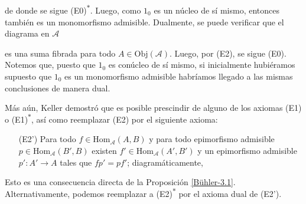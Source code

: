 \documentclass[tesis]{subfiles}
\begin{document}
\begin{Obs}
\begin{enumerate}[label=(\arabic*)]
    \begin{center}
    \end{center}
    de donde se sigue (E0)\textsuperscript{$\ast$}. Luego, como $1_0$ es un núcleo de sí mismo, entonces también es un monomorfismo admisible. Dualmente, se puede verificar que el diagrama en $\mathscr{A}$
    \begin{center}
    \end{center}
    es una suma fibrada para todo $A\in\text{Obj}(\mathscr{A})$. Luego, por (E2), se sigue (E0). Notemos que, puesto que $1_0$ es conúcleo de sí mismo, si inicialmente hubiéramos supuesto que $1_0$ es un monomorfismo admisible habríamos llegado a las mismas conclusiones de manera dual.
    
    Más aún, Keller\cite[Appendix~A]{Keller} demostró que es posible prescindir de alguno de los axiomas (E1) o (E1)\textsuperscript{$\ast$}, así como reemplazar (E2) por el siguiente axioma:

    \begin{itemize}
        \item[(E2')] Para todo $f\in\text{Hom}_\mathscr{A}(A,B)$ y para todo epimorfismo admisible $p\in\text{Hom}_\mathscr{A}(B',B)$ existen $f'\in\text{Hom}_\mathscr{A}(A',B')$ y un epimorfismo admisible $p':A'\to A$ tales que $fp'=pf'$; diagramáticamente,
            \begin{center}
            \end{center}
    \end{itemize}
    Esto es una consecuencia directa de la Proposición \ref{Bühler-3.1}. Alternativamente, podemos reemplazar a (E2)\textsuperscript{$\ast$} por el axioma dual de (E2').


\end{enumerate}
\end{Obs}
\end{document}
